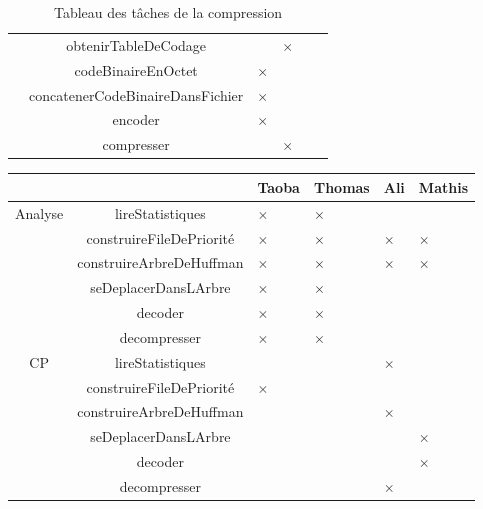 \begin{table}[ht]
\begin{tabular}{|c|c|>{\centering\arraybackslash}p{1.5cm}|>{\centering\arraybackslash}p{1.5cm}|>{\centering\arraybackslash}p{1.5cm}|>{\centering\arraybackslash}p{1.5cm}|}
        \cline{2-6}
        & obtenirTableDeCodage & & $\times$ & & \\
        \cline{2-6}
        & codeBinaireEnOctet & $\times$ & & & \\
        \cline{2-6}
        & concatenerCodeBinaireDansFichier & $\times$ & & & \\
        \cline{2-6}
        & encoder & $\times$ & & & \\
        \cline{2-6}
        & compresser & & $\times$ & & \\
        \hline
    \end{tabular}
    \caption{Tableau des tâches de la compression}
  \end{table}  
 
 
 \begin{table}[ht]
    \centering
    \begin{tabular}{|c|c|>{\centering\arraybackslash}p{1.5cm}|>{\centering\arraybackslash}p{1.5cm}|>{\centering\arraybackslash}p{1.5cm}|>{\centering\arraybackslash}p{1.5cm}|}
        \cline{3-6}
        \multicolumn{2}{c|}{} & Taoba & Thomas & Ali & Mathis \\
        \hline
        \multirow{6}{*}{Analyse}
        & lireStatistiques & $\times$ & $\times$ & & \\
        \cline{2-6}
        & construireFileDePriorité & $\times$ & $\times$ & $\times$ & $\times$ \\
        \cline{2-6}
        & construireArbreDeHuffman & $\times$ & $\times$ & $\times$ & $\times$ \\
        \cline{2-6}
        & seDeplacerDansLArbre & $\times$ & $\times$ & & \\
        \cline{2-6}
        & decoder & $\times$ & $\times$ & & \\
        \cline{2-6}
        & decompresser & $\times$ & $\times$ & & \\ 
        \hline
         \multirow{6}{*}{CP}
        & lireStatistiques & & & $\times$ & \\
        \cline{2-6}
        & construireFileDePriorité & $\times$ & & &  \\
        \cline{2-6}
        & construireArbreDeHuffman & & & $\times$ & \\
        \cline{2-6}
        & seDeplacerDansLArbre & & & & $\times$ \\
        \cline{2-6}
        & decoder & & & & $\times$ \\
        \cline{2-6}
        & decompresser & & & $\times$ & \\ 

\end{tabular}
\end{table}
